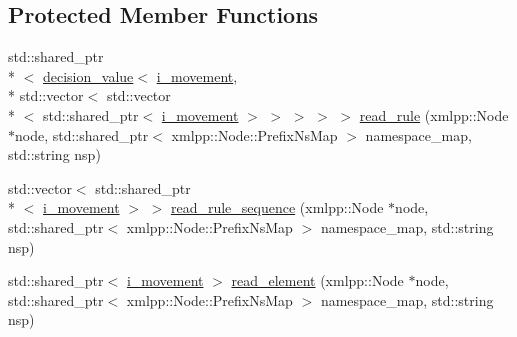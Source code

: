 \subsection*{Protected Member Functions}
\begin{DoxyCompactItemize}
\item 
std\-::shared\-\_\-ptr\\*
$<$ \hyperlink{classmae_1_1fl_1_1laban_1_1decision__value}{decision\-\_\-value}$<$ \hyperlink{classmae_1_1fl_1_1laban_1_1i__movement}{i\-\_\-movement}, \\*
std\-::vector$<$ std\-::vector\\*
$<$ std\-::shared\-\_\-ptr$<$ \hyperlink{classmae_1_1fl_1_1laban_1_1i__movement}{i\-\_\-movement} $>$ $>$ $>$ $>$ $>$ \hyperlink{classmae_1_1fl_1_1laban_1_1internal__rewriting__rules__reader_a83ae7739433e924f87927f35093ed388}{read\-\_\-rule} (xmlpp\-::\-Node $\ast$node, std\-::shared\-\_\-ptr$<$ xmlpp\-::\-Node\-::\-Prefix\-Ns\-Map $>$ namespace\-\_\-map, std\-::string nsp)
\item 
std\-::vector$<$ std\-::shared\-\_\-ptr\\*
$<$ \hyperlink{classmae_1_1fl_1_1laban_1_1i__movement}{i\-\_\-movement} $>$ $>$ \hyperlink{classmae_1_1fl_1_1laban_1_1internal__rewriting__rules__reader_acaa14dd57e922a8571cac7d603e3a6d7}{read\-\_\-rule\-\_\-sequence} (xmlpp\-::\-Node $\ast$node, std\-::shared\-\_\-ptr$<$ xmlpp\-::\-Node\-::\-Prefix\-Ns\-Map $>$ namespace\-\_\-map, std\-::string nsp)
\item 
std\-::shared\-\_\-ptr$<$ \hyperlink{classmae_1_1fl_1_1laban_1_1i__movement}{i\-\_\-movement} $>$ \hyperlink{classmae_1_1fl_1_1laban_1_1internal__rewriting__rules__reader_a789731f08886cba4a57478fa6dcf9976}{read\-\_\-element} (xmlpp\-::\-Node $\ast$node, std\-::shared\-\_\-ptr$<$ xmlpp\-::\-Node\-::\-Prefix\-Ns\-Map $>$ namespace\-\_\-map, std\-::string nsp)
\end{DoxyCompactItemize}


